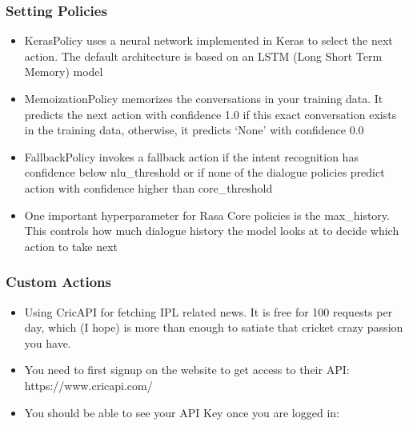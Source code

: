  \begin{frame}[fragile]\frametitle{Setting Policies}

 
\begin{itemize}
\item KerasPolicy uses a neural network implemented in Keras to select the next action. The default architecture is based on an LSTM (Long Short Term Memory) model
\item MemoizationPolicy memorizes the conversations in your training data. It predicts the next action with confidence 1.0 if this exact conversation exists in the training data, otherwise, it predicts ‘None’ with confidence 0.0
\item FallbackPolicy invokes a fallback action if the intent recognition has confidence below nlu\_threshold or if none of the dialogue policies predict action with confidence higher than core\_threshold
\item One important hyperparameter for Rasa Core policies is the max\_history. This controls how much dialogue history the model looks at to decide which action to take next
\end{itemize}

\end{frame}

 \begin{frame}[fragile]\frametitle{Custom Actions}

 
\begin{itemize}
\item Using CricAPI for fetching IPL related news. It is free for 100 requests per day, which (I hope) is more than enough to satiate that cricket crazy passion you have.
\item You need to first signup on the website to get access to their API: https://www.cricapi.com/
\item You should be able to see your API Key once you are logged in:
\end{itemize}

\end{frame}

